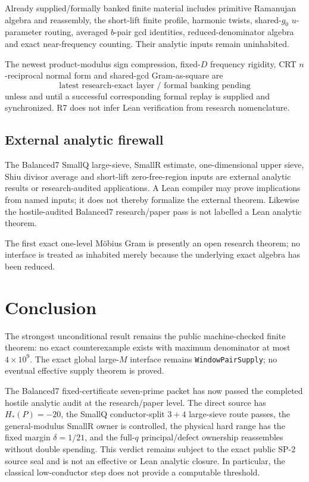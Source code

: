 \documentclass[11pt]{article}
\theoremstyle{definition}
\newcommand{\1}{\mathbf 1}
\begin{document}
Already supplied/formally banked finite material includes primitive Ramanujan algebra and
reassembly, the short-lift finite profile, harmonic twists, shared-$g_0$ $u$-parameter
routing, averaged $b$-pair gcd identities, reduced-denominator algebra and exact
near-frequency counting.  Their analytic inputs remain uninhabited.

The newest product-modulus sign compression, fixed-$D$ frequency rigidity, CRT
$n$-reciprocal normal form and shared-gcd Gram-as-square are
\[
\boxed{\text{latest research-exact layer / formal banking pending}}
\]
unless and until a successful corresponding formal replay is supplied and synchronized.
R7 does not infer Lean verification from research nomenclature.

\subsection{External analytic firewall}

The Balanced7 SmallQ large-sieve, SmallR estimate, one-dimensional upper sieve, Shiu
divisor average and short-lift zero-free-region inputs are external analytic results or
research-audited applications.  A Lean compiler may prove implications from named inputs;
it does not thereby formalize the external theorem.  Likewise the hostile-audited
Balanced7 research/paper pass is not labelled a Lean analytic theorem.

The first exact one-level M\"obius Gram is presently an open research theorem; no
interface is treated as inhabited merely because the underlying exact algebra has been
reduced.


\section{Conclusion}

The strongest unconditional result remains the public machine-checked finite theorem: no
exact counterexample exists with maximum denominator at most $4\times10^9$.  The exact
global large-$M$ interface remains \texttt{WindowPairSupply}; no eventual effective supply
theorem is proved.

The Balanced7 fixed-certificate seven-prime packet has now passed the completed hostile
analytic audit at the research/paper level.  The direct source has $H_*(P)=-20$, the
SmallQ conductor-split $3+4$ large-sieve route passes, the general-modulus SmallR owner is
controlled, the physical hard range has the fixed margin $\delta=1/21$, and the full-$q$
principal/defect ownership reassembles without double spending.  This verdict remains
subject to the exact public SP-2 source seal and is not an effective or Lean analytic
closure.  In particular, the classical low-conductor step does not provide a computable
threshold.
\end{document}
